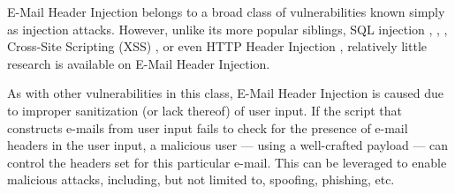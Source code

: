 E-Mail Header Injection belongs to a broad class of vulnerabilities known simply as injection attacks. However, unlike its more popular siblings, SQL injection \cite{sql1}, \cite{sql0}, \cite{sql2}, Cross-Site Scripting (XSS) \cite{Injection1}, \cite{KleinAmit} or even HTTP Header Injection \cite{sessionride}, relatively little research is available on E-Mail Header Injection.

As with other vulnerabilities in this class, E-Mail Header Injection is caused due to improper sanitization (or lack thereof) of user input. If the script that constructs e-mails from user input fails to check for the presence of e-mail headers in the user input, a malicious user --- using a well-crafted payload --- can control the headers set for this particular e-mail. This can be leveraged to enable malicious attacks, including, but not limited to, spoofing, phishing, etc.